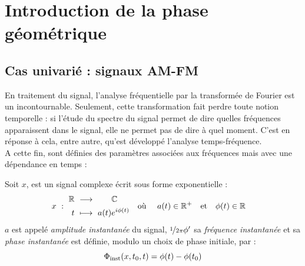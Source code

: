 \section{Introduction de la phase géométrique} \label{sec:intro_phaseg}




\subsection{Cas univarié : signaux AM-FM} \label{sec:ana_temp-freq}


En traitement du signal, l'analyse fréquentielle par la transformée de Fourier est un incontournable. 
Seulement, cette transformation fait perdre toute notion temporelle : si l'étude du spectre du signal permet de dire quelles fréquences apparaissent dans le signal, elle ne permet pas de dire à quel moment. 
C'est en réponse à cela, entre autre, qu'est développé l'analyse temps-fréquence. 
\\
A cette fin, sont définies des paramètres associées aux fréquences mais avec une dépendance en temps :\par

\begin{definition} \label{def:param_instant}
	Soit $x$, est un signal complexe écrit sous forme exponentielle :
	\begin{align}
		x\ &:\ \begin{aligned}\mathbb{R}\ &\longrightarrow\qquad \mathbb{C} \\
			t\ &\longmapsto\ a(t)e^{i\phi(t)}
		\end{aligned}  &  \text{où }\quad a(t)\in\mathbb{R}^+\quad &\text{et}\quad \phi(t)\in\mathbb{R}
	\end{align}
	$a$ est appelé \emph{amplitude instantanée} du signal, $\nicefrac{1}{2\pi}\phi'$ sa \emph{fréquence instantanée} et sa \emph{phase instantanée} est définie, modulo un choix de phase initiale, par :
	\begin{equation} \label{eq:phasei}
		\Phi_{\text{\normalfont inst}}(x,t_0,t) = \phi(t) - \phi(t_0)
	\end{equation}
\end{definition}
\skipl 

